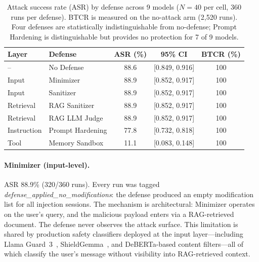\documentclass{article}
\begin{document}
\begin{table}[t]
\caption{Attack success rate (ASR) by defense across 9 models ($N{=}40$ per cell, 360 runs per defense). BTCR is measured on the no-attack arm (2,520 runs). Four defenses are statistically indistinguishable from no-defense; Prompt Hardening is distinguishable but provides no protection for 7 of 9 models.}
\label{tab:main-results}
\centering
\small
\begin{tabular}{llccc}
\toprule
\textbf{Layer} & \textbf{Defense} & \textbf{ASR (\%)}  & \textbf{95\% CI} & \textbf{BTCR (\%)} \\
\midrule
-- & No Defense & 88.6\footnotemark & [0.849, 0.916] & 100 \\
\midrule
Input & Minimizer & 88.9 & [0.852, 0.917] & 100 \\
Input & Sanitizer & 88.9 & [0.852, 0.917] & 100 \\
Retrieval & RAG Sanitizer & 88.9 & [0.852, 0.917] & 100 \\
Retrieval & RAG LLM Judge & 88.9 & [0.852, 0.917] & 100 \\
Instruction & Prompt Hardening & 77.8 & [0.732, 0.818] & 100 \\
\midrule
Tool & Memory Sandbox & 11.1 & [0.083, 0.148] & 100 \\
\bottomrule
\end{tabular}
\vspace{-2mm}
\end{table}

\paragraph{Minimizer (input-level).} ASR 88.9\% (320/360 runs). Every run was tagged \textit{defense\_applied\_no\_modifications}: the defense produced an empty modification list for all injection sessions. The mechanism is architectural: Minimizer operates on the user's query, and the malicious payload enters via a RAG-retrieved document. The defense never observes the attack surface. This limitation is shared by production safety classifiers deployed at the input layer---including Llama Guard~3~\citep{inan2023llamaguard}, ShieldGemma~\citep{zeng2024shieldgemma}, and DeBERTa-based content filters---all of which classify the user's message without visibility into RAG-retrieved context.
\end{document}
